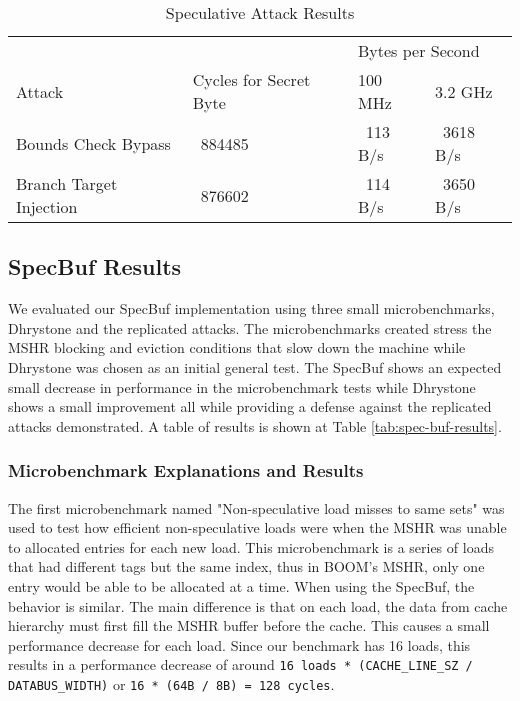 \begin{table}
\centering
\caption{Speculative Attack Results}
\label{tab:spec-attack-results}
\begin{tabular}{@{} *4l @{}} \toprule
    &                        & \multicolumn{2}{l}{Bytes per Second} \\
    Attack                  & Cycles for Secret Byte &           100 MHz &   3.2 GHz \\ \midrule
    Bounds Check Bypass     &                ~884485 &          ~113 B/s & ~3618 B/s \\
    Branch Target Injection &                ~876602 &          ~114 B/s & ~3650 B/s \\ \bottomrule
\end{tabular}
\end{table}

\subsection{SpecBuf Results} \label{SpecBuf Results}

We evaluated our SpecBuf implementation using three small microbenchmarks, Dhrystone and the 
replicated attacks. The microbenchmarks created stress the MSHR blocking and eviction conditions
that slow down the machine while Dhrystone was chosen as an initial general test. The SpecBuf shows an expected small decrease
in performance in the microbenchmark tests while Dhrystone shows a small improvement all while providing
a defense against the replicated attacks demonstrated. A table of results is shown at Table \ref{tab:spec-buf-results}.

\subsubsection{Microbenchmark Explanations and Results}

The first microbenchmark named "Non-speculative load misses to same sets" was used to test how efficient non-speculative loads
were when the MSHR was unable to allocated entries for each new load. This microbenchmark is a series of loads that had different
tags but the same index, thus in BOOM's MSHR, only one entry would be able to be allocated at a time. When using the SpecBuf, the 
behavior is similar. The main difference is that on each load, the data from cache hierarchy must first fill the MSHR buffer
before the cache. This causes a small performance decrease for each load. Since our benchmark has 16 loads, this results in a performance decrease of around
{\tt 16 loads * (CACHE\_LINE\_SZ / DATABUS\_WIDTH)} or {\tt 16 * (64B / 8B) = 128 cycles}.

